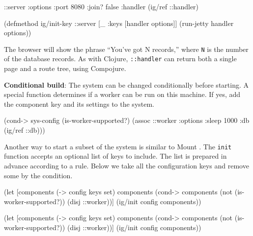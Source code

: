 \else

\begin{english}
  \begin{clojure}
{::server {:options {:port 8080 :join? false}
           :handler (ig/ref ::handler)}}

(defmethod ig/init-key ::server
  [_ {:keys [handler options]}]
  (run-jetty handler options))
  \end{clojure}
\end{english}

\fi

The browser will show the phrase ``You've got N records,'' where \verb|N| is the number of the database records. As with Clojure, \verb|::handler| can return both a single page and a route tree, using Compojure.


\textbf{Conditional build}: The system can be changed conditionally before starting. A special function determines if a worker can be run on this machine. If yes, add the component key and its settings to the system.

\begin{english}
  \begin{clojure}
(cond-> sys-config
  (is-worker-supported?)
  (assoc ::worker {:options {:sleep 1000}
                   :db (ig/ref ::db)}))
  \end{clojure}
\end{english}

Another way to start a subset of the system is similar to Mount . The \verb|init| function accepts an optional list of keys to include. The list is prepared in advance according to a rule. Below we take all the configuration keys and remove some by the condition.

\ifnarrow

\begin{english}
  \begin{clojure}
(let [components (-> config keys set)
      components
      (cond-> components
        (not (is-worker-supported?))
        (disj ::worker))]
  (ig/init config components))
  \end{clojure}
\end{english}

\else

\begin{english}
  \begin{clojure}
(let [components (-> config keys set)
      components (cond-> components
                   (not (is-worker-supported?))
                   (disj ::worker))]
  (ig/init config components))
  \end{clojure}
\end{english}


